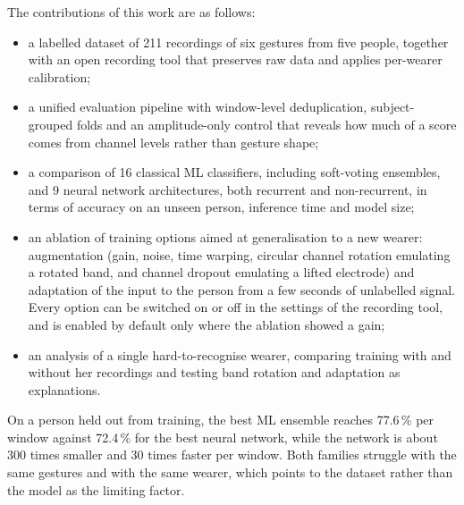 \documentclass[conference]{IEEEtran}
\begin{document}
The contributions of this work are as follows:
\begin{itemize}
  \item a labelled dataset of 211 recordings of six gestures from five
        people, together with an open recording tool that preserves raw data
        and applies per-wearer calibration;
  \item a unified evaluation pipeline with window-level deduplication,
        subject-grouped folds and an amplitude-only control that reveals how
        much of a score comes from channel levels rather than gesture shape;
  \item a comparison of 16 classical ML classifiers, including soft-voting
        ensembles, and 9 neural network architectures, both recurrent and
        non-recurrent, in terms of accuracy on an unseen person, inference time
        and model size;
  \item an ablation of training options aimed at generalisation to a new
        wearer: augmentation (gain, noise, time warping, circular channel
        rotation emulating a rotated band, and channel dropout emulating a
        lifted electrode) and adaptation of the input to the person from a few
        seconds of unlabelled signal. Every option can be switched on or off
        in the settings of the recording tool, and is enabled by default only
        where the ablation showed a gain;
  \item an analysis of a single hard-to-recognise wearer, comparing training
        with and without her recordings and testing band rotation and
        adaptation as explanations.
\end{itemize}
On a person held out from training, the best ML ensemble reaches
77.6\,\% per window against 72.4\,\% for the best neural network, while the
network is about 300 times smaller and 30 times faster per window. Both
families struggle with the same gestures and with the same wearer, which
points to the dataset rather than the model as the limiting factor.
\end{document}
